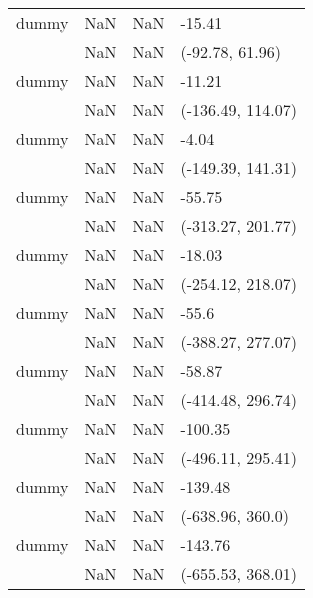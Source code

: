 \begin{tabular}{llll}
dummy           &                     NaN &                    NaN &                -15.41 \\
                &                     NaN &                    NaN &       (-92.78, 61.96) \\
dummy           &                     NaN &                    NaN &                -11.21 \\
                &                     NaN &                    NaN &     (-136.49, 114.07) \\
dummy           &                     NaN &                    NaN &                 -4.04 \\
                &                     NaN &                    NaN &     (-149.39, 141.31) \\
dummy           &                     NaN &                    NaN &                -55.75 \\
                &                     NaN &                    NaN &     (-313.27, 201.77) \\
dummy           &                     NaN &                    NaN &                -18.03 \\
                &                     NaN &                    NaN &     (-254.12, 218.07) \\
dummy           &                     NaN &                    NaN &                 -55.6 \\
                &                     NaN &                    NaN &     (-388.27, 277.07) \\
dummy           &                     NaN &                    NaN &                -58.87 \\
                &                     NaN &                    NaN &     (-414.48, 296.74) \\
dummy           &                     NaN &                    NaN &               -100.35 \\
                &                     NaN &                    NaN &     (-496.11, 295.41) \\
dummy           &                     NaN &                    NaN &               -139.48 \\
                &                     NaN &                    NaN &      (-638.96, 360.0) \\
dummy           &                     NaN &                    NaN &               -143.76 \\
                &                     NaN &                    NaN &     (-655.53, 368.01) \\

\end{tabular}
